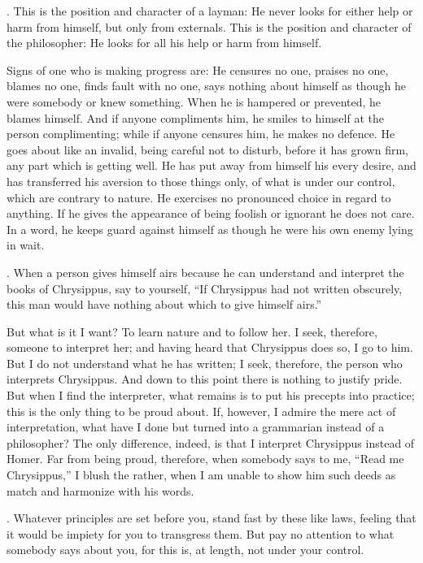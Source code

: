 . This is the position and character of a layman: He never looks for either help or harm from himself, but only from externals. This is the position and character of the philosopher: He looks for all his help or harm from himself.

Signs of one who is making progress are: He censures no one, praises no one, blames no one, finds fault with no one, says nothing about himself as though he were somebody or knew something. When he is hampered or prevented, he blames himself. And if anyone compliments him, he smiles to himself at the person complimenting; while if anyone censures him, he makes no defence. He goes about like an invalid, being careful not to disturb, before it has grown firm, any part which is getting well. He has put away from himself his every desire, and has transferred his aversion to those things only, of what is under our control, which are contrary to nature. He exercises no pronounced choice in regard to anything. If he gives the appearance of being foolish or ignorant he does not care. In a word, he keeps guard against himself as though he were his own enemy lying in wait.

. When a person gives himself airs because he can understand and interpret the books of Chrysippus, say to yourself, ``If Chrysippus had not written obscurely, this man would have nothing about which to give himself airs.''

But what is it I want? To learn nature and to follow her. I seek, therefore, someone to interpret her; and having heard that Chrysippus does so, I go to him. But I do not understand what he has written; I seek, therefore, the person who interprets Chrysippus. And down to this point there is nothing to justify pride. But when I find the interpreter, what remains is to put his precepts into practice; this is the only thing to be proud about. If, however, I admire the mere act of interpretation, what have I done but turned into a grammarian instead of a philosopher? The only difference, indeed, is that I interpret Chrysippus instead of Homer. Far from being proud, therefore, when somebody says to me, ``Read me Chrysippus,'' I blush the rather, when I am unable to show him such deeds as match and harmonize with his words.

. Whatever principles are set before you, stand fast by these like laws, feeling that it would be impiety for you to transgress them. But pay no attention to what somebody says about you, for this is, at length, not under your control.

